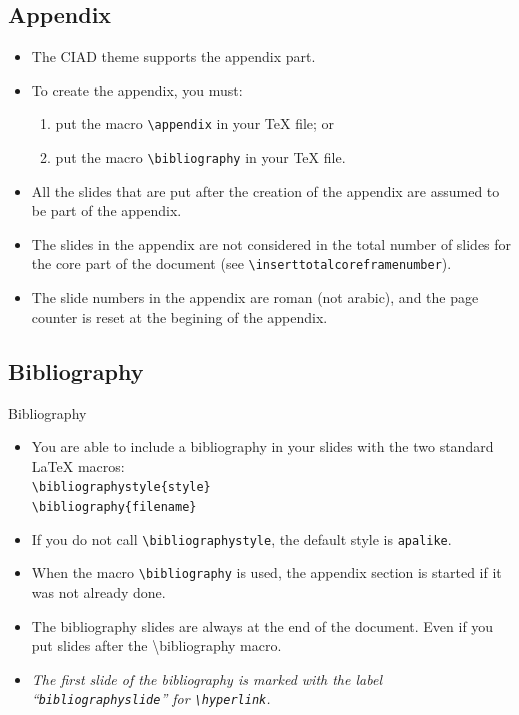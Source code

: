 \documentclass[english,sectioncirclenumberstyle]{ciadbeamer}
\begin{document}
\subsection{Appendix}

\begin{frame}{\subsecname}
	\begin{itemize}
	\item The CIAD theme supports the appendix part.
	\vspace{1em}
	\item To create the appendix, you must:
		\begin{enumerate}
		\item put the macro \texttt{{\textbackslash}appendix} in your {\TeX} file; or
		\item put the macro \texttt{{\textbackslash}bibliography} in your {\TeX} file.
		\end{enumerate}
	\vspace{1em}
	\item All the slides that are put after the creation of the appendix are assumed to be part of the appendix.
	\item The slides in the appendix are not considered in the total number of slides for the core part of the document (see \texttt{{\textbackslash}inserttotalcoreframenumber}).
	\item The slide numbers in the appendix are roman (not arabic), and the page counter is reset at the begining of the appendix.
	\end{itemize}
\end{frame}

\subsection{Bibliography}

\begin{frame}{Bibliography}
	\begin{itemize}
	\item You are able to include a bibliography in your slides with the two standard {\LaTeX} macros: \\
		\texttt{{\textbackslash}bibliographystyle\{style\}} \\
		\texttt{{\textbackslash}bibliography\{filename\}}
	\vspace{1em}
	\item If you do not call \texttt{{\textbackslash}bibliographystyle}, the default style is \texttt{apalike}.
	\vspace{1em}
	\item When the macro \texttt{{\textbackslash}bibliography} is used, the appendix section is started if it was not already done.
	\item The bibliography slides are \alert{always at the end of the document}. Even if you put slides after the {\textbackslash}bibliography macro.
	\item \emph{The first slide of the bibliography is marked with the label ``\texttt{bibliographyslide}'' for \texttt{{\textbackslash}hyperlink}.}
	\end{itemize}
\end{frame}
\end{document}
